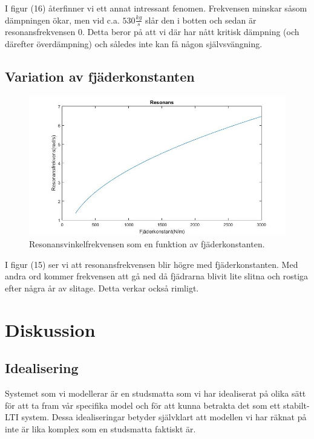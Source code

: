 \documentclass[10pt,a4paper]{article}
\begin{document}
I figur (16) återfinner vi ett annat intressant fenomen. Frekvensen minskar såsom dämpningen ökar, men vid c.a. $530\frac{kg}{s}$ slår den i botten och sedan är resonansfrekvensen $0$. Detta beror på att vi där har nått kritisk dämpning (och därefter överdämpning) och således inte kan få någon självsvängning.
\newpage

\subsection{Variation av fjäderkonstanten}

\begin{figure}[h]
\begin{center}
\includegraphics[scale=0.4]{resonansFjader}
\caption{Resonansvinkelfrekvensen som en funktion av fjäderkonstanten.}
\end{center}
\end{figure}

I figur (15) ser vi att resonansfrekvensen blir högre med fjäderkonstanten. Med andra ord kommer frekvensen att gå ned då fjädrarna blivit lite slitna och rostiga efter några år av slitage. Detta verkar också rimligt.



\section{Diskussion}

\subsection{Idealisering}
Systemet som vi modellerar är en studsmatta som vi har idealiserat på olika sätt för att ta fram vår specifika model och för att kunna betrakta det som ett stabilt-LTI system. Dessa idealiseringar betyder självklart att modellen vi har räknat på inte är lika komplex som en studsmatta faktiskt är. 
\end{document}
